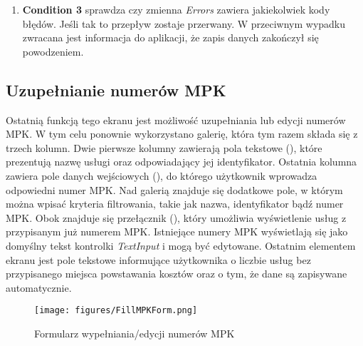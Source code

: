 \begin{enumerate}
\begin{itemize}
    \item  \textbf{Replace Template Data} -- wstawia wybrane informacje do szablonu rządania HTTP.
    \item \textbf{batchData} -- w kroku tym, znaki specjalne są zakodowane procentowo\footnote{\emph{Kodowanie procentowe} -- metoda reprezentowania znaków specjalnych w adresach URL w formie zgodnej z protokołem HTTP. Polega na zastępowaniu niebezpiecznych lub niedozwolonych znaków ich odpowiednikami w postaci procentowego kodu, który składa się z symbolu "\%" i dwóch cyfr szesnastkowych reprezentujących kod ASCII danego znaku.} (znane również jako \emph{kodowanie URL}). Jest to wymagane aby uniknąć błędów. 
    \item \textbf{Send Batch Request} -- wysyła rządanie aktualizacji danych do SharePoint.
    \item \textbf{Assign result of send batch data to Error var} -- przypisuje odpowiedź serwera na wysłane rządanie w celu późniejszej analizy.
    \end{itemize}
    
    \item \textbf{Condition 3} sprawdza czy zmienna \emph{Errors} zawiera jakiekolwiek kody błędów. Jeśli tak to przepływ zostaje przerwany. W przeciwnym wypadku zwracana jest informacja do aplikacji, że zapis danych zakończył się powodzeniem.
\end{enumerate}

\subsection{Uzupełnianie numerów MPK}
Ostatnią funkcją tego ekranu jest możliwość uzupełniania lub edycji numerów MPK. W tym celu ponownie wykorzystano galerię, która tym razem składa się z trzech kolumn. Dwie pierwsze kolumny zawierają pola tekstowe (), które prezentują nazwę usługi oraz odpowiadający jej identyfikator. Ostatnia kolumna zawiera pole danych wejściowych (), do którego użytkownik wprowadza odpowiedni numer MPK. Nad galerią znajduje się dodatkowe pole, w którym można wpisać kryteria filtrowania, takie jak nazwa, identyfikator bądź numer MPK. Obok znajduje się przełącznik (), który umożliwia wyświetlenie usług z przypisanym już numerem MPK. Istniejące numery MPK wyświetlają się jako domyślny tekst kontrolki \emph{TextInput} i mogą być edytowane. Ostatnim elementem ekranu jest pole tekstowe informujące użytkownika o liczbie usług bez przypisanego miejsca powstawania kosztów oraz o tym, że dane są zapisywane automatycznie.
\begin{figure}[t]
    \centering
    \texttt{[image: figures/FillMPKForm.png]}
    \caption{Formularz wypełniania/edycji numerów MPK}
    \label{fig:fillmpkform}
\end{figure}